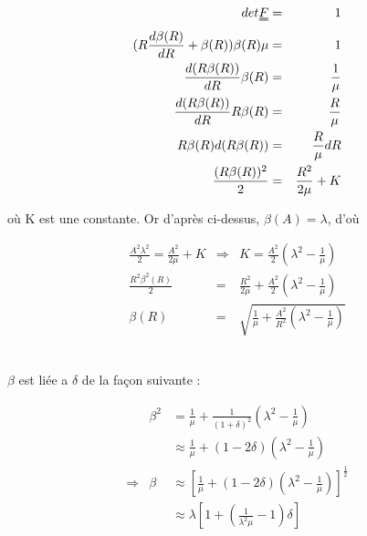 \documentclass[a4paper,11pt]{article}
\newcommand{\FRAC}{\displaystyle\frac}
\newcommand{\tens}{\uuline}
\begin{document}
\begin{eqnarray*}
det \tens{F} &=& 1\\
(R \frac{d\beta(R)}{dR} + \beta(R)) \beta(R) \mu &=& 1\\
\frac{d (R \beta(R))}{dR} \beta(R) &=& \frac {1}{\mu}\\
\frac{d (R \beta(R))}{dR} R\beta(R) &=& \frac {R}{\mu}\\
R\beta(R) d(R\beta(R)) &=& \frac{R}{\mu} dR\\
\frac{(R\beta(R))^2}{2} &=& \frac{R^2}{2\mu}+K\\
\end{eqnarray*}

où K est une constante. Or d'après ci-dessus, $\beta(A) = \lambda$, d'où

\begin{eqnarray*}
\frac{A^2\lambda^2}{2} = \frac{A^2}{2\mu}+K &\Longrightarrow& K = \frac{A^2}{2}\left(\lambda^2-\frac{1}{\mu}\right)\\
\frac{R^2 \beta^2(R)}{2} &=& \frac{R^2}{2\mu}+\frac{A^2}{2}\left(\lambda^2 - \frac{1}{\mu}\right)\\
\beta(R) &=& \sqrt{\frac{1}{\mu}+ \frac{A^2}{R^2}\left(\lambda^2 - \frac{1}{\mu}\right)}\\
\end{eqnarray*}

\subsection{}

$\beta$ est liée a $\delta$ de la façon suivante :

\begin{center}
\begin{displaymath}
\begin{array}{rll}

& \beta^2 & = \FRAC{1}{\mu}+\frac{1}{\left(1+\delta\right)^2}\left(\lambda^2-\frac{1}{\mu}\right)  \\
&  & \displaystyle \approx  \frac{1}{\mu}+\left(1-2\delta\right)\left(\lambda^2-\frac{1}{\mu}\right) \\
\Rightarrow & \beta & \displaystyle \approx \left[\frac{1}{\mu} + \left(1-2\delta \right)\left(\lambda^2 -\frac{1}{\mu} \right) \right]^{\frac{1}{2}} \\
& &\displaystyle \approx \lambda\left[1+\left(\frac{1}{\lambda^2\mu}-1 \right)\delta \right]\\
\end{array}
\end{displaymath}
\end{center}
\end{document}
